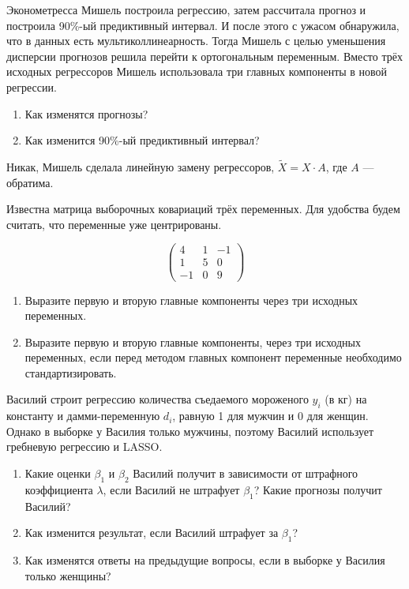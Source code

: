 \begin{problem}
Эконометресса Мишель построила регрессию, затем рассчитала прогноз и построила 90\%-ый предиктивный интервал. И после этого с ужасом обнаружила, что в данных есть мультиколлинеарность. Тогда Мишель с целью уменьшения дисперсии прогнозов решила перейти к ортогональным переменным. Вместо трёх исходных регрессоров Мишель использовала три главных компоненты в новой регрессии.

\begin{enumerate}
\item Как изменятся прогнозы?
\item Как изменится 90\%-ый предиктивный интервал?
\end{enumerate}


\begin{sol}
Никак, Мишель сделала линейную замену регрессоров, $\tilde X = X \cdot A$, где $A$ — обратима.
\end{sol}
\end{problem}


\begin{problem}
Известна матрица выборочных ковариаций трёх переменных. Для удобства будем считать, что переменные уже центрированы.

\[
\begin{pmatrix}
4 & 1 & -1 \\
1 & 5 & 0 \\
-1 & 0 & 9
\end{pmatrix}
\]

\begin{enumerate}
\item Выразите первую и вторую главные компоненты через три исходных переменных.
\item Выразите первую и вторую главные компоненты, через три исходных переменных, если перед методом главных компонент переменные необходимо стандартизировать.
\end{enumerate}
\begin{sol}
\end{sol}
\end{problem}

\begin{problem}
Василий строит регрессию количества съедаемого мороженого $y_i$ (в кг) на константу и дамми-переменную $d_i$, равную 1 для мужчин и 0 для женщин. Однако в выборке у Василия только мужчины, поэтому Василий использует гребневую регрессию и LASSO.

\begin{enumerate}
\item Какие оценки $\beta_1$ и $\beta_2$ Василий получит в зависимости от штрафного коэффициента $\lambda$, если Василий не штрафует $\beta_1$? Какие прогнозы получит Василий?
\item Как изменится результат, если Василий штрафует за $\beta_1$?
\item Как изменятся ответы на предыдущие вопросы, если в выборке у Василия только женщины?
\end{enumerate}


\begin{sol}
\end{sol}
\end{problem}



